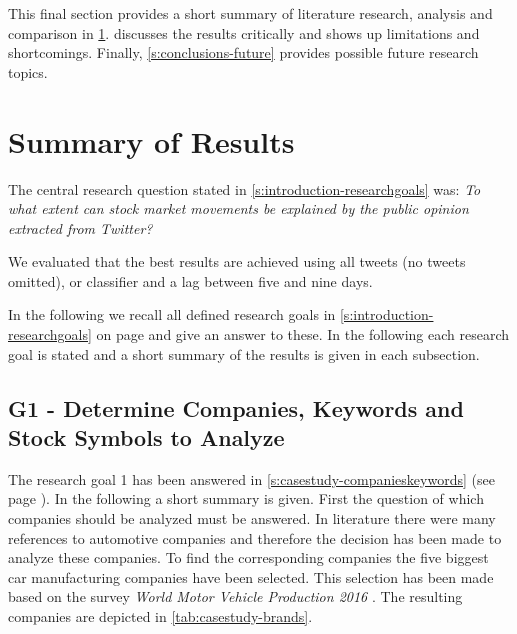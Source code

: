 This final section provides a short summary of literature research, analysis and comparison in \cref{s:conclusions-summary}.
 discusses the results critically and shows up limitations and shortcomings. 
Finally, \cref{s:conclusions-future} provides possible future research topics.

\section{Summary of Results}
\label{s:conclusions-summary}

The central research question stated in \cref{s:introduction-researchgoals} was: \emph{To what extent can stock market movements be explained by the public opinion extracted from Twitter?}

We evaluated that the best results are achieved using all tweets (no tweets omitted), \svm{} or \nb{} classifier and a lag between five and nine days.

In the following we recall all defined research goals in \cref{s:introduction-researchgoals} on page \pageref{s:introduction-researchgoals} and give an answer to these.
In the following each research goal is stated and a short summary of the results is given in each subsection.


\subsection{G1 - Determine Companies, Keywords and Stock Symbols to Analyze}
\label{ss:conclusion-summary-g1}


The research goal 1 has been answered in \cref{s:casestudy-companieskeywords} (see page \pageref{s:casestudy-companieskeywords}).
In the following a short summary is given.
First the question of which companies should be analyzed must be answered.
In literature there were many references to automotive companies and therefore the decision has been made to analyze these companies.
To find the corresponding companies the five biggest car manufacturing companies have been selected.
This selection has been made based on the survey \emph{World Motor Vehicle Production 2016} \citep{OICA2016}. 
The resulting companies are depicted in \cref{tab:casestudy-brands}.

